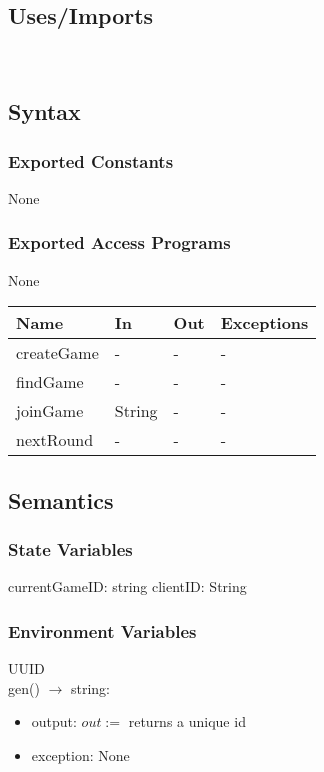 \documentclass[12pt, titlepage]{article}
\begin{document}
\subsection{Uses/Imports}

 \\

\subsection{Syntax}


\subsubsection{Exported Constants}
None

\subsubsection{Exported Access Programs}
None

\begin{center}
\begin{tabular}{|p{2cm} | p{4cm} | p{4cm} | p{2cm} |}
\hline
\textbf{Name} & \textbf{In} & \textbf{Out} & \textbf{Exceptions} \\

\hline
createGame & - & - & - \\
\hline
findGame & - & - & - \\
\hline
joinGame & String & - & - \\
\hline
nextRound & - & - & - \\
\hline
\end{tabular}
\end{center}

\subsection{Semantics}

\subsubsection{State Variables}

currentGameID: string
clientID: String 

\subsubsection{Environment Variables}

UUID\\
gen() $\rightarrow$ string:
\begin{itemize}
    \item output: $out := $ returns a unique id
    \item exception:    None
\end{itemize}
\end{document}

